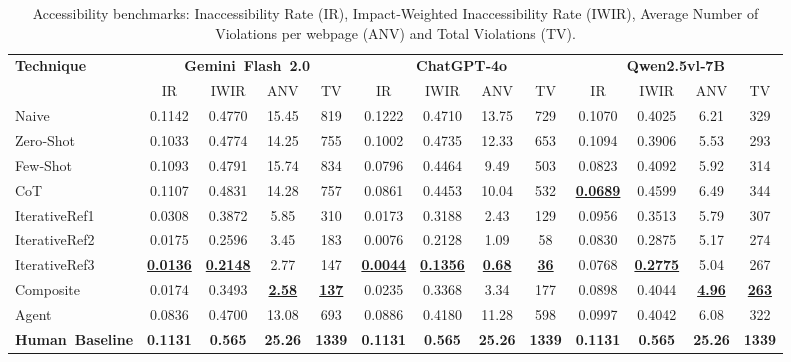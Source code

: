 \begin{table}[htbp]
  \centering
  \footnotesize
  \caption{Accessibility benchmarks: Inaccessibility Rate (IR), Impact‑Weighted
           Inaccessibility Rate (IWIR), Average Number of Violations per webpage
           (ANV) and Total Violations (TV).}
  \label{tab:webcode2m}
  \setlength{\tabcolsep}{4pt}
  \begin{tabular}{l *{3}{cccc}} 
    \toprule
    \multirow{2}{*}{\textbf{Technique}} &
      \multicolumn{4}{c}{\textbf{Gemini Flash 2.0}} &
      \multicolumn{4}{c}{\textbf{ChatGPT‑4o}} &
      \multicolumn{4}{c}{\textbf{Qwen2.5vl‑7B}} \\

    \cmidrule(lr){2-5}\cmidrule(lr){6-9}\cmidrule(l){10-13}
      & IR & IWIR & ANV & TV
      & IR & IWIR & ANV & TV
      & IR & IWIR & ANV & TV \\
    \midrule
    Naive                & 0.1142 & 0.4770 & 15.45 & 819 & 0.1222 & 0.4710 & 13.75 & 729 & 0.1070 & 0.4025 & 6.21 & 329 \\
    Zero‑Shot            & 0.1033 & 0.4774 & 14.25 & 755  & 0.1002 & 0.4735 & 12.33 & 653  & 0.1094 & 0.3906 & 5.53 & 293 \\
    Few‑Shot             & 0.1093 & 0.4791 & 15.74 & 834  & 0.0796 & 0.4464 & 9.49 & 503  & 0.0823 & 0.4092 & 5.92 & 314 \\
    CoT            & 0.1107 & 0.4831 & 14.28 & 757  & 0.0861 & 0.4453 & 10.04 & 532 & \underline{\textbf{0.0689}} & 0.4599 & 6.49 & 344 \\
    IterativeRef1     & 0.0308 & 0.3872 & 5.85 & 310  & 0.0173 & 0.3188 & 2.43 & 129  & 0.0956 & 0.3513 & 5.79 & 307 \\
    IterativeRef2     & 0.0175 & 0.2596 & 3.45 & 183  & 0.0076 & 0.2128 & 1.09 & 58  & 0.0830 & 0.2875 & 5.17 & 274 \\
    IterativeRef3     & \underline{\textbf{0.0136}} & \underline{\textbf{0.2148}} & 2.77 & 147
                         & \underline{\textbf{0.0044}} & \underline{\textbf{0.1356}} & \underline{\textbf{0.68}} & \underline{\textbf{36}}
                         & 0.0768 & \underline{\textbf{0.2775}} & 5.04 & 267 \\
    Composite            & 0.0174 & 0.3493 & \underline{\textbf{2.58}} & \underline{\textbf{137}} & 0.0235 & 0.3368 & 3.34 & 177  & 0.0898 & 0.4044 & \underline{\textbf{4.96}} & \underline{\textbf{263}} \\
    Agent                & 0.0836 & 0.4700 & 13.08 & 693  & 0.0886 & 0.4180 & 11.28 & 598  & 0.0997 & 0.4042 & 6.08 & 322 \\
    \bottomrule
\addlinespace[2pt]
\textbf{Human Baseline} & \textbf{0.1131} & \textbf{0.565} & \textbf{25.26} & \textbf{1339} 
                        & \textbf{0.1131} & \textbf{0.565} & \textbf{25.26} & \textbf{1339} 
                        & \textbf{0.1131} & \textbf{0.565} & \textbf{25.26} & \textbf{1339} \\
\bottomrule
  \end{tabular}
\end{table}





